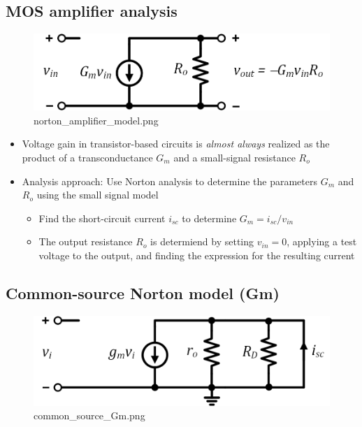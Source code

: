 \documentclass[11pt]{article}
\providecommand{\tightlist}{%
      \setlength{\itemsep}{0pt}\setlength{\parskip}{0pt}}
\begin{document}
    \hypertarget{mos-amplifier-analysis}{%
\subsection{MOS amplifier analysis}\label{mos-amplifier-analysis}}

    \begin{figure}
\centering
\includegraphics{norton_amplifier_model.png}
\caption{norton\_amplifier\_model.png}
\end{figure}

    \begin{itemize}
\tightlist
\item
  Voltage gain in transistor-based circuits is \emph{almost always}
  realized as the product of a transconductance \(G_m\) and a
  small-signal resistance \(R_o\)
\item
  Analysis approach: Use Norton analysis to determine the parameters
  \(G_m\) and \(R_o\) using the small signal model

  \begin{itemize}
  \tightlist
  \item
    Find the short-circuit current \(i_{sc}\) to determine
    \(G_m = i_{sc}/v_{in}\)
  \item
    The output resistance \(R_o\) is determiend by setting
    \(v_{in} = 0\), applying a test voltage to the output, and finding
    the expression for the resulting current
  \end{itemize}
\end{itemize}

    \hypertarget{common-source-norton-model-gm}{%
\subsection{Common-source Norton model
(Gm)}\label{common-source-norton-model-gm}}

    \begin{figure}
\centering
\includegraphics{common_source_Gm.png}
\caption{common\_source\_Gm.png}
\end{figure}
\end{document}
